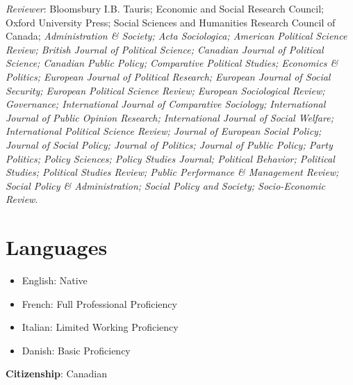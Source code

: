 \documentclass[letterpaper,fontsize=10.5pt]{scrartcl}
\begin{document}
\hfill \break
{}
{}\textit{Reviewer}: Bloomsbury I.B. Tauris; Economic and Social Research Council; Oxford University Press; Social Sciences and Humanities Research Council of Canada; \textit{Administration \& Society; Acta Sociologica; American Political Science Review; British Journal of Political Science; Canadian Journal of Political Science; Canadian Public Policy; Comparative Political Studies; Economics \& Politics; European Journal of Political Research; European Journal of Social Security; European Political Science Review; European Sociological Review; Governance; International Journal of Comparative Sociology; International Journal of Public Opinion Research; International Journal of Social Welfare; International Political Science Review; Journal of European Social Policy; Journal of Social Policy; Journal of Politics; Journal of Public Policy; Party Politics; Policy Sciences; Policy Studies Journal; Political Behavior; Political Studies; Political Studies Review; Public Performance \& Management Review; Social Policy \& Administration; Social Policy and Society; Socio-Economic Review}.

\section{Languages}
\begin{itemize}[itemsep=0em, topsep=0em, partopsep=0em]
	\item English: Native
	\item French: Full Professional Proficiency
	\item Italian: Limited Working Proficiency
	\item Danish: Basic Proficiency\\
\end{itemize}

{}\textbf{Citizenship}: Canadian

\end{document}
